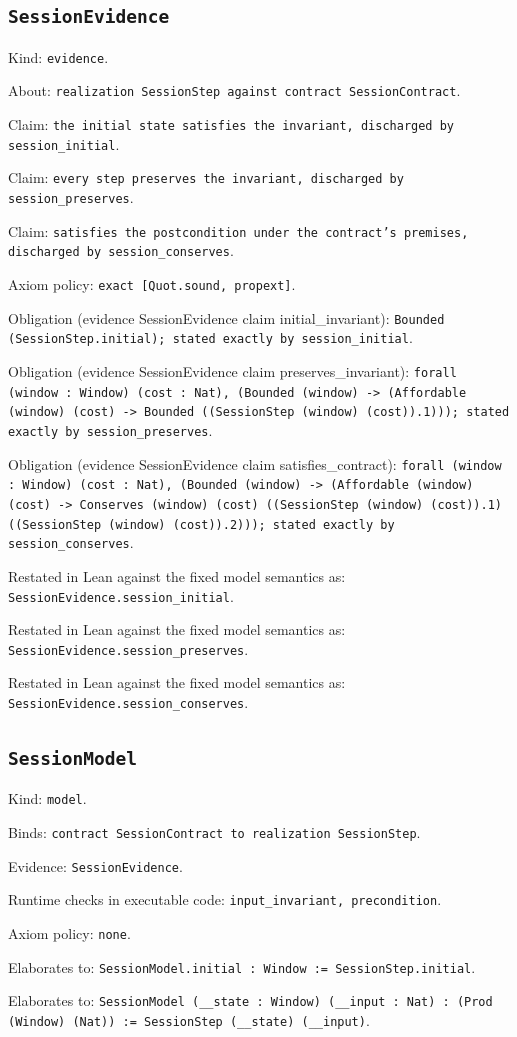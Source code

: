 \documentclass[11pt]{article}
\begin{document}
\subsection*{\texttt{SessionEvidence}}
\noindent Kind: \texttt{evidence}.\par
\noindent About: \texttt{realization SessionStep against contract SessionContract}.\par
\noindent Claim: \texttt{the initial state satisfies the invariant, discharged by session\_initial}.\par
\noindent Claim: \texttt{every step preserves the invariant, discharged by session\_preserves}.\par
\noindent Claim: \texttt{satisfies the postcondition under the contract's premises, discharged by session\_conserves}.\par
\noindent Axiom policy: \texttt{exact [Quot.sound, propext]}.\par
\noindent Obligation (evidence SessionEvidence claim initial\_invariant): \texttt{Bounded (SessionStep.initial); stated exactly by session\_initial}.\par
\noindent Obligation (evidence SessionEvidence claim preserves\_invariant): \texttt{forall (window : Window) (cost : Nat), (Bounded (window) -> (Affordable (window) (cost) -> Bounded ((SessionStep (window) (cost)).1))); stated exactly by session\_preserves}.\par
\noindent Obligation (evidence SessionEvidence claim satisfies\_contract): \texttt{forall (window : Window) (cost : Nat), (Bounded (window) -> (Affordable (window) (cost) -> Conserves (window) (cost) ((SessionStep (window) (cost)).1) ((SessionStep (window) (cost)).2))); stated exactly by session\_conserves}.\par
\noindent Restated in Lean against the fixed model semantics as: \texttt{SessionEvidence.session\_initial}.\par
\noindent Restated in Lean against the fixed model semantics as: \texttt{SessionEvidence.session\_preserves}.\par
\noindent Restated in Lean against the fixed model semantics as: \texttt{SessionEvidence.session\_conserves}.\par
\subsection*{\texttt{SessionModel}}
\noindent Kind: \texttt{model}.\par
\noindent Binds: \texttt{contract SessionContract to realization SessionStep}.\par
\noindent Evidence: \texttt{SessionEvidence}.\par
\noindent Runtime checks in executable code: \texttt{input\_invariant, precondition}.\par
\noindent Axiom policy: \texttt{none}.\par
\noindent Elaborates to: \texttt{SessionModel.initial : Window := SessionStep.initial}.\par
\noindent Elaborates to: \texttt{SessionModel (\_\_state : Window) (\_\_input : Nat) : (Prod (Window) (Nat)) := SessionStep (\_\_state) (\_\_input)}.\par
\end{document}
